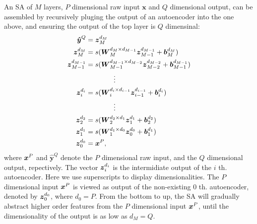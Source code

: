 An SA of $M$ layers, $P$ dimensional raw input $\boldsymbol{x}$ and $Q$ dimensional output, can be assembled by recursively pluging the output of an autoencoder into the one above, and ensuring the output of the top layer is $Q$ dimensinal:
\begin{equation} \label{eq:ES}
  \begin{split}
    \boldsymbol{\hat{y}}^Q &= {\boldsymbol{z}_{M}^{d_{M}}} \\
    {\boldsymbol{z}_{M  }^{d_{M  }}} &= s(\boldsymbol{W}_{M  }^{d_{M  } \times d_{M-1}} {\boldsymbol{z}_{M-1}^{d_{M-1}}} + \boldsymbol{b}_{M  }^{d_{M  }}) \\
    {\boldsymbol{z}_{M-1}^{d_{M-1}}} &= s(\boldsymbol{W}_{M-1}^{d_{M-1} \times d_{M-2}} {\boldsymbol{z}_{M-2}^{d_{M-2}}} + \boldsymbol{b}_{M-1}^{d_{M-1}}) \\
    & \quad \quad \quad \quad \vdots \\
    {\boldsymbol{z}_{i  }^{d_{i  }}} &= s(\boldsymbol{W}_{i  }^{d_{i  } \times d_{i-1}} {\boldsymbol{z}_{i-1}^{d_{i-1}}} + \boldsymbol{b}_{i  }^{d_{i  }}) \\
    & \quad \quad \quad \quad \vdots \\
    {\boldsymbol{z}_{2  }^{d_{2  }}} &= s(\boldsymbol{W}_{2  }^{d_{2  } \times d_{1  }} {\boldsymbol{z}_{1  }^{d_{1  }}} + \boldsymbol{b}_{2  }^{d_{2  }}) \\
    {\boldsymbol{z}_{1  }^{d_{1  }}} &= s(\boldsymbol{W}_{1  }^{d_{1  } \times d_{0  }} {\boldsymbol{z}_{0  }^{d_{0  }}} + \boldsymbol{b}_{1  }^{d_{1  }}) \\
    {\boldsymbol{z}_{0  }^{d_{0  }}} &= \boldsymbol{x}^P,
  \end{split}
\end{equation}
where $\boldsymbol{x}^P$ and $\boldsymbol{\hat{y}}^Q$ denote the $P$ dimensional raw input, and the $Q$ dimensional output, repectively. The vector $\boldsymbol{z}_i^{d_i}$ is the intermidiate output of the $i$ th. autoencoder. Here we use superscripts to display dimensionalities. The $P$ dimensional input $\boldsymbol{x}^P$ is viewed as output of the non-existing $0$ th. autoencoder, denoted by $\boldsymbol{z}_0^{d_0}$, where $d_0=P$. From the bottom to up, the SA will gradually abstract higher order features from the $P$ dimensional input $\boldsymbol{x}^P$, until the dimensionality of the output is as low as $d_M=Q$.

